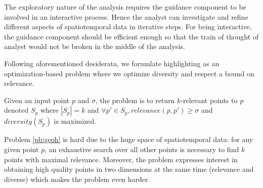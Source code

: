  The exploratory nature of the analysis requires the guidance component to be involved in an interactive process. Hence the analyst can investigate and refine different aspects of spatiotemporal data in iterative steps. For being interactive, the guidance component should be efficient enough so that the train of thought of analyst would not be broken in the middle of the analysis.

\vspace{5pt}
Following aforementioned desiderata, we forumlate highlighting as an optimization-based problem where we optimize diversity and respect a bound on relevance.

\begin{problem}[GeoGuidance]
\label{pb:geoh}
Given an input point $p$ and $\sigma$, the problem is to return $k$-relevant points to $p$ denoted $S_p$ where $|S_p| = k$ and $\forall p' \in S_p, \mathit{relevance}(p,p') \geq \sigma$ and $\mathit{diversity}(S_p)$ is maximized.
\end{problem}

Problem \ref{pb:geoh} is hard due to the huge space of spatiotemporal data: for any given point $p$, an exhaustive search over all other points is necessary to find $k$ points with maximal relevance. Moreover, the problem expresses interest in obtaining high quality points in two dimensions at the same time (relevance and diverse) which makes the problem even harder.

